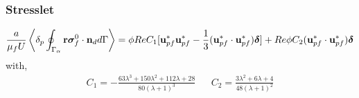 \documentclass{sintefbeamer}
\begin{document}
\begin{frame}
  \frametitle{Stresslet}
  \begin{multline}
    \frac{a}{\mu_f U}
        \left<\delta_p \oint_{\Gamma_{\alpha}} \textbf{r}\bm{\sigma}_f^0 \cdot \textbf{n}_d d\Gamma\right>
    =
     \phi Re C_1
    [
        \textbf{u}_{pf}^*\textbf{u}_{pf}^* - \frac{1}{3}(\textbf{u}_{pf}^*\cdot \textbf{u}_{pf}^*)\bm\delta 
    ]
    + Re \phi C_2 (\textbf{u}_{pf}^*\cdot \textbf{u}_{pf}^*) \bm\delta
    \label{eq:stresslet_trans}
\end{multline} 
with, 
\begin{align}
    C_1  =  -\frac{63 \lambda^{3} + 150 \lambda^{2} + 112 \lambda + 28}{80 \left(\lambda + 1\right)^{3}}
    &&
    C_2  = \frac{3\lambda^2 + 6\lambda + 4}{48(\lambda +1 )^2}
\end{align}

\end{frame}
\end{document}
